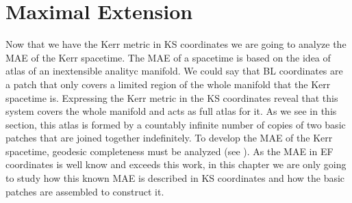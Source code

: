 \chapter{Maximal Extension}\label{ch:MAE}

Now that we have the Kerr metric in \gls{KS} coordinates we are going to analyze the \gls{MAE} of the Kerr spacetime. The \gls{MAE} of a spacetime is based on the idea of atlas of an inextensible analityc manifold. We could say that \gls{BL} coordinates are a patch that only covers a limited region of the whole manifold that the Kerr spacetime is. Expressing the Kerr metric in the \gls{KS} coordinates reveal that this system covers the whole manifold and acts as full atlas for it. As we see in this section, this atlas is formed by a countably infinite number of copies of two basic patches that are joined together indefinitely. To develop the \gls{MAE} of the Kerr spacetime, geodesic completeness must be analyzed (see \cite{o1995geometry}). As the \gls{MAE} in \gls{EF} coordinates is well know \cite{carter1968global,o1995geometry} and exceeds this work, in this chapter we are only going to study how this known \gls{MAE} is described in \gls{KS} coordinates and how the basic patches are assembled to construct it.

